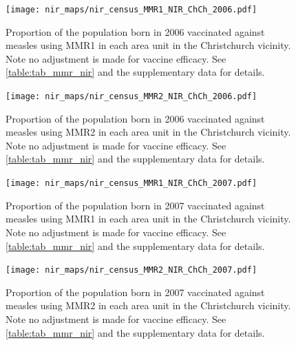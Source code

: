 \documentclass{article}
\begin{document}
\begin{figure}
   \begin{center}
    \texttt{[image: nir\_maps/nir\_census\_MMR1\_NIR\_ChCh\_2006.pdf]}
    \end{center}
    \caption{Proportion of the population born in 2006 vaccinated against measles using MMR1 in each area unit in the Christchurch vicinity. Note no adjustment is made for vaccine efficacy. See \autoref{table:tab_mmr_nir} and the supplementary data for details.}
\label{fig:fig12006_c}
\end{figure}

\begin{figure}
\begin{center}
\texttt{[image: nir\_maps/nir\_census\_MMR2\_NIR\_ChCh\_2006.pdf]}
\end{center}
    \caption{Proportion of the population born in 2006 vaccinated against measles using MMR2 in each area unit in the Christchurch vicinity. Note no adjustment is made for vaccine efficacy. See \autoref{table:tab_mmr_nir} and the supplementary data for details.}
\label{fig:fig22006_c}
\end{figure}


\begin{figure}
\begin{center}
\texttt{[image: nir\_maps/nir\_census\_MMR1\_NIR\_ChCh\_2007.pdf]}
\end{center}
    \caption{Proportion of the population born in 2007 vaccinated against measles using MMR1 in each area unit in the Christchurch vicinity. Note no adjustment is made for vaccine efficacy. See \autoref{table:tab_mmr_nir} and the supplementary data for details.}
\label{fig:fig12007_c}
\end{figure}


\begin{figure}
\begin{center}
    \texttt{[image: nir\_maps/nir\_census\_MMR2\_NIR\_ChCh\_2007.pdf]}
\end{center}
    \caption{Proportion of the population born in 2007 vaccinated against measles using MMR2 in each area unit in the Christchurch vicinity. Note no adjustment is made for vaccine efficacy. See \autoref{table:tab_mmr_nir} and the supplementary data for details.}
\label{fig:fig22007_c}
\end{figure}
\end{document}
